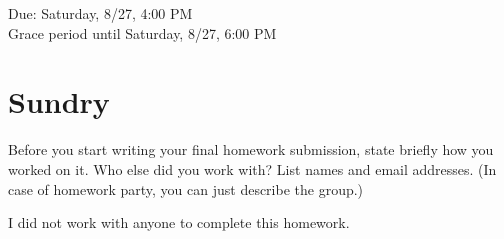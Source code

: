 \documentclass[11pt]{article}
\begin{document}
\maketitle
\fontsize{12}{15}\selectfont
\linespread{1.3}
\allowdisplaybreaks


\begin{center}
    Due: Saturday, 8/27, 4:00 PM \\
    Grace period until Saturday, 8/27, 6:00 PM \\
\end{center}

\section*{Sundry}
Before you start writing your final homework submission, state briefly how you worked on it.  Who else did you work with?  List names and email addresses.  (In case of homework party, you can just describe the group.)


\begin{solution}
  I did not work with anyone to complete this homework.
\end{solution}


\vspace{15pt}

\end{document}
